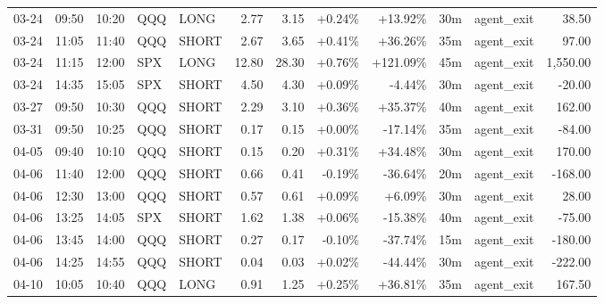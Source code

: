 \documentclass[11pt,a4paper,twoside]{article}
\begin{document}
\begin{center}
\begin{longtable}{>{\color{txtmain}}l l l l l r r r r r >{\color{txtmain}}l r}
03-24 & 09:50 & 10:20 & QQQ & LONG & 2.77 & 3.15 & \textcolor{wingreen}{+0.24\%} & \textcolor{wingreen}{+13.92\%} & 30m & agent\_exit & \textcolor{wingreen}{38.50} \\
03-24 & 11:05 & 11:40 & QQQ & SHORT & 2.67 & 3.65 & \textcolor{wingreen}{+0.41\%} & \textcolor{wingreen}{+36.26\%} & 35m & agent\_exit & \textcolor{wingreen}{97.00} \\
03-24 & 11:15 & 12:00 & SPX & LONG & 12.80 & 28.30 & \textcolor{wingreen}{+0.76\%} & \textcolor{wingreen}{+121.09\%} & 45m & agent\_exit & \textcolor{wingreen}{1,550.00} \\
03-24 & 14:35 & 15:05 & SPX & SHORT & 4.50 & 4.30 & \textcolor{wingreen}{+0.09\%} & \textcolor{lossred}{-4.44\%} & 30m & agent\_exit & \textcolor{lossred}{-20.00} \\
03-27 & 09:50 & 10:30 & QQQ & SHORT & 2.29 & 3.10 & \textcolor{wingreen}{+0.36\%} & \textcolor{wingreen}{+35.37\%} & 40m & agent\_exit & \textcolor{wingreen}{162.00} \\
03-31 & 09:50 & 10:25 & QQQ & SHORT & 0.17 & 0.15 & \textcolor{wingreen}{+0.00\%} & \textcolor{lossred}{-17.14\%} & 35m & agent\_exit & \textcolor{lossred}{-84.00} \\
04-05 & 09:40 & 10:10 & QQQ & SHORT & 0.15 & 0.20 & \textcolor{wingreen}{+0.31\%} & \textcolor{wingreen}{+34.48\%} & 30m & agent\_exit & \textcolor{wingreen}{170.00} \\
04-06 & 11:40 & 12:00 & QQQ & SHORT & 0.66 & 0.41 & \textcolor{lossred}{-0.19\%} & \textcolor{lossred}{-36.64\%} & 20m & agent\_exit & \textcolor{lossred}{-168.00} \\
04-06 & 12:30 & 13:00 & QQQ & SHORT & 0.57 & 0.61 & \textcolor{wingreen}{+0.09\%} & \textcolor{wingreen}{+6.09\%} & 30m & agent\_exit & \textcolor{wingreen}{28.00} \\
04-06 & 13:25 & 14:05 & SPX & SHORT & 1.62 & 1.38 & \textcolor{wingreen}{+0.06\%} & \textcolor{lossred}{-15.38\%} & 40m & agent\_exit & \textcolor{lossred}{-75.00} \\
04-06 & 13:45 & 14:00 & QQQ & SHORT & 0.27 & 0.17 & \textcolor{lossred}{-0.10\%} & \textcolor{lossred}{-37.74\%} & 15m & agent\_exit & \textcolor{lossred}{-180.00} \\
04-06 & 14:25 & 14:55 & QQQ & SHORT & 0.04 & 0.03 & \textcolor{wingreen}{+0.02\%} & \textcolor{lossred}{-44.44\%} & 30m & agent\_exit & \textcolor{lossred}{-222.00} \\
04-10 & 10:05 & 10:40 & QQQ & LONG & 0.91 & 1.25 & \textcolor{wingreen}{+0.25\%} & \textcolor{wingreen}{+36.81\%} & 35m & agent\_exit & \textcolor{wingreen}{167.50} \\

\end{longtable}
\end{center}
\end{document}
